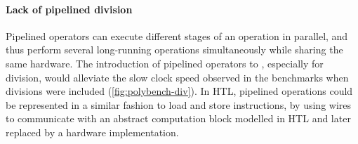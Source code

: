 

\paragraph{Lack of pipelined division}
Pipelined operators can execute different stages of an operation in parallel, and thus perform several long-running operations simultaneously while sharing the same hardware.
The introduction of pipelined operators to \vericert{}, especially for division, would alleviate the slow clock speed observed in the \polybench{} benchmarks when divisions were included (\cref{fig:polybench-div}). In HTL, pipelined operations could be represented in a similar fashion to load and store instructions, by using wires to communicate with an abstract computation block modelled in HTL and later replaced by a hardware implementation.

